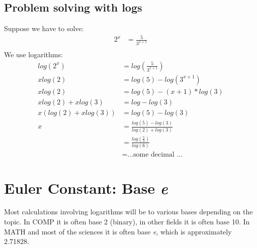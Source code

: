 \subsection{Problem solving with logs}
Suppose we have to solve:
\begin{align}
  2^{x} & = \frac{5}{3^{x+1}} \\
\end{align}
We use logarithms:
\begin{align}
  log(2^x) & = log(\frac{5}{3^{x+1}}) \\
  x log(2) & = log(5) - log(3^{x+1}) \\
  x log(2) & = log(5) - (x+1) * log(3) \\
  x log(2) + x log(3)  & = log - log(3) \\
  x(log(2) + x log(3)) & = log(5) - log(3) \\
  x & = \frac{log(5) - log(3)}{log(2) + log(3)} \\
    & = \frac{log(\frac{5}{3})}{log(6)} \\
    & = \text{\ldots some decimal \ldots }
\end{align}

\section{Euler Constant: Base \emph{e}}
\label{sec:EulerConstantBaseE}
Most calculations involving logarithms will be to various bases depending on
the topic. In COMP it is often base 2 (binary), in other fields it is often base
10. In MATH and most of the sciences it is often base \emph{e}, which is
approximately 2.71828. \cite{duWGx}